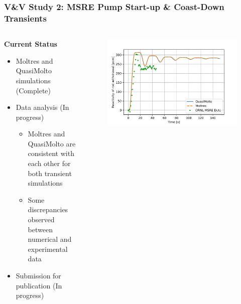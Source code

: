 \begin{frame}
  \frametitle{V\&V Study 2: MSRE Pump Start-up \& Coast-Down Transients}
  \begin{columns}
    \column{6.5cm}
    \begin{block}{\textbf{Current Status}}
      \begin{itemize}
        \item Moltres and QuasiMolto simulations (Complete)
        \item Data analysis (In progress)
          \begin{itemize}
            \item Moltres and QuasiMolto are consistent with each other for both transient
              simulations
            \item Some discrepancies observed between numerical and experimental
              data
          \end{itemize}
        \item Submission for publication (In progress)
      \end{itemize}
    \end{block}
%
    \column{4.5cm}
    \begin{figure}
      \centering
      \includegraphics[width=.9\columnwidth]{images/start-up-v2-reactivity}

\end{figure}
\end{columns}
\end{frame}
